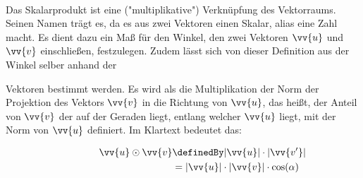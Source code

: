 \documentclass[main.tex]{subfiles}
\begin{document}
    \paragraph{} Das Skalarprodukt ist eine ("multiplikative") Verknüpfung des Vektorraums. Seinen Namen trägt es, da es aus zwei Vektoren
    einen Skalar, alias eine Zahl macht. Es dient dazu ein Maß für den Winkel, den zwei Vektoren $\vv{u}$ und $\vv{v}$ einschließen,
    festzulegen. Zudem lässt sich von dieser Definition aus der Winkel selber anhand der
    \begin{wrapfigure}[4]{r}[1cm]{0.45\textwidth}
    \end{wrapfigure}

    Vektoren bestimmt werden.
    Es wird als die Multiplikation der Norm der Projektion des Vektors $\vv{v}$ in die Richtung von $\vv{u}$, das heißt, der Anteil
    von $\vv{v}$ der auf der Geraden liegt, entlang welcher $\vv{u}$ liegt, mit der Norm von $\vv{u}$ definiert. Im Klartext bedeutet das:
    \begin{Definition}
      \begin{align*}
          \qquad \qquad \vv{u} \odot \vv{v} &\definedBy |\vv{u}| \cdot |\vv{v'}| \\
                              &= |\vv{u}| \cdot |\vv{v}| \cdot \cos(\alpha) \\
      \end{align*}
    \end{Definition}\\
\end{document}
